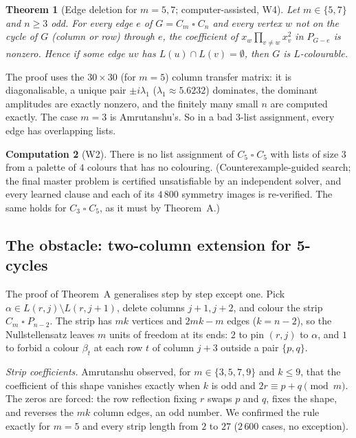 \documentclass[11pt]{article}
\theoremstyle{plain}
\newtheorem{theorem}{Theorem}[section]
\theoremstyle{definition}
\newtheorem{computation}[theorem]{Computation}
\theoremstyle{remark}
\newcommand{\T}{\mathbin{\square}}
\begin{document}
\begin{theorem}[Edge deletion for $m = 5, 7$; computer-assisted, W4]\label{thm:edge}
Let $m \in \{5, 7\}$ and $n \ge 3$ odd. For every edge $e$ of $G = C_m \T C_n$ and every vertex $w$
not on the cycle of $G$ (column or row) through $e$, the coefficient of
$x_w \prod_{v \ne w} x_v^2$ in $P_{G - e}$ is nonzero. Hence if some edge $uv$ has $L(u) \cap L(v)
= \emptyset$, then $G$ is $L$-colourable.
\end{theorem}

The proof uses the $30 \times 30$ (for $m = 5$) column transfer matrix: it is diagonalisable,
a unique pair $\pm i\lambda_1$ ($\lambda_1 \approx 5.6232$) dominates, the dominant amplitudes are
exactly nonzero, and the finitely many small $n$ are computed exactly. The case $m = 3$ is
Amrutanshu's. So in a bad 3-list assignment, every edge has overlapping lists.

\begin{computation}[W2]\label{comp:c5c5}
There is no list assignment of $C_5 \T C_5$ with lists of size $3$ from a palette of $4$ colours
that has no colouring. (Counterexample-guided search; the final master problem is certified
unsatisfiable by an independent solver, and every learned clause and each of its $4\,800$
symmetry images is re-verified. The same holds for $C_3 \T C_5$, as it must by Theorem~A.)
\end{computation}

\subsection{The obstacle: two-column extension for 5-cycles}

The proof of Theorem~A generalises step by step except one. Pick $\alpha \in L(r, j) \setminus
L(r, j+1)$, delete columns $j+1, j+2$, and colour the strip $C_m \T P_{n-2}$. The strip has $mk$
vertices and $2mk - m$ edges ($k = n - 2$), so the Nullstellensatz leaves $m$ units of freedom at
its ends: $2$ to pin $(r, j)$ to $\alpha$, and $1$ to forbid a colour $\beta_t$ at each row $t$ of
column $j + 3$ outside a pair $\{p, q\}$.

\emph{Strip coefficients.} Amrutanshu observed, for $m \in \{3,5,7,9\}$ and $k \le 9$, that the
coefficient of this shape vanishes exactly when $k$ is odd and $2r \equiv p + q \pmod m$. The
zeros are forced: the row reflection fixing $r$ swaps $p$ and $q$, fixes the shape, and reverses
the $mk$ column edges, an odd number. We confirmed the rule exactly for $m = 5$ and every strip
length from $2$ to $27$ ($2\,600$ cases, no exception).
\end{document}
